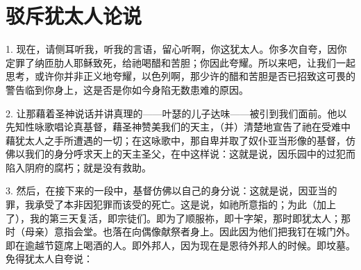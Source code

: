 
\chapter{驳斥犹太人论说}


1. 现在，请侧耳听我，听我的言语，留心听啊，你这犹太人。你多次自夸，因你定罪了纳匝肋人耶稣致死，给祂喝醋和苦胆；你因此夸耀。所以来吧，让我们一起思考，或许你并非正义地夸耀，以色列啊，那少许的醋和苦胆是否已招致这可畏的警告临到你身上，这是否是你如今身陷无数患难的原因。\par

2. 让那藉着圣神说话并讲真理的——叶瑟的儿子达味——被引到我们面前。他以先知性咏歌唱论真基督，藉圣神赞美我们的天主，（并）清楚地宣告了祂在受难中藉犹太人之手所遭遇的一切；在这咏歌中，那自卑并取了奴仆亚当形像的基督，仿佛以我们的身分呼求天上的天主圣父，在中这样说：这就是说，因乐园中的过犯而陷入阴府的腐朽；就是没有救助。\par

3. 然后，在接下来的一段中，基督仿佛以自己的身分说：这就是说，因亚当的罪，我承受了本非因犯罪而该受的死亡。这是说，如祂所意指的；为此（加上了），我的第三天复活，即宗徒们。即为了顺服祢，即十字架，那时即犹太人；那时（母亲）意指会堂。也落在向偶像献祭者身上。因此因为他们把我钉在城门外。即在逾越节筵席上喝酒的人。即外邦人，因为现在是恩待外邦人的时候。即坟墓。免得犹太人自夸说：\par

